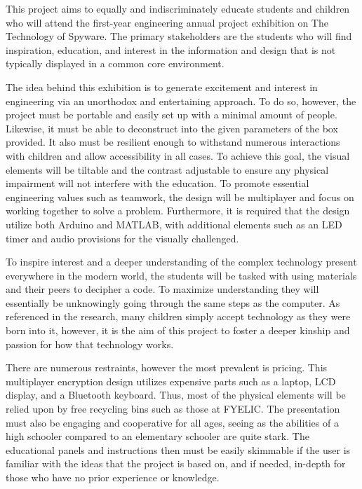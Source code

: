 \documentclass[conference]{IEEEtran}
\begin{document}
\par This project aims to equally and indiscriminately educate students and children who will attend the first-year engineering annual project exhibition on The Technology of Spyware. The primary stakeholders are the students who will find inspiration, education, and interest in the information and design that is not typically displayed in a common core environment.  
\par The idea behind this exhibition is to generate excitement and interest in engineering via an unorthodox and entertaining approach. To do so, however, the project must be portable and easily set up with a minimal amount of people. Likewise, it must be able to deconstruct into the given parameters of the box provided. It also must be resilient enough to withstand numerous interactions with children and allow accessibility in all cases. To achieve this goal, the visual elements will be tiltable and the contrast adjustable to ensure any physical impairment will not interfere with the education. To promote essential engineering values such as teamwork, the design will be multiplayer and focus on working together to solve a problem. Furthermore, it is required that the design utilize both Arduino and MATLAB, with additional elements such as an LED timer and audio provisions for the visually challenged. 
\par To inspire interest and a deeper understanding of the complex technology present everywhere in the modern world, the students will be tasked with using materials and their peers to decipher a code. To maximize understanding they will essentially be unknowingly going through the same steps as the computer. As referenced in the research, many children simply accept technology as they were born into it, however, it is the aim of this project to foster a deeper kinship and passion for how that technology works. 
\par There are numerous restraints, however the most prevalent is pricing. This multiplayer encryption design utilizes expensive parts such as a laptop, LCD display, and a Bluetooth keyboard. Thus, most of the physical elements will be relied upon by free recycling bins such as those at FYELIC. The presentation must also be engaging and cooperative for all ages, seeing as the abilities of a high schooler compared to an elementary schooler are quite stark. The educational panels and instructions then must be easily skimmable if the user is familiar with the ideas that the project is based on, and if needed, in-depth for those who have no prior experience or knowledge. 
\end{document}
